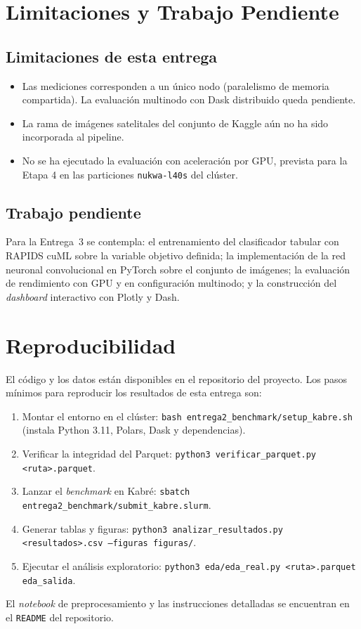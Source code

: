 \documentclass[conference]{IEEEtran}
\begin{document}
\section{Limitaciones y Trabajo Pendiente}

\subsection{Limitaciones de esta entrega}
\begin{itemize}
\item Las mediciones corresponden a un único nodo (paralelismo de memoria compartida). La evaluación multinodo con Dask distribuido queda pendiente.
\item La rama de imágenes satelitales del conjunto de Kaggle aún no ha sido incorporada al pipeline.
\item No se ha ejecutado la evaluación con aceleración por GPU, prevista para la Etapa 4 en las particiones \texttt{nukwa-l40s} del clúster.
\end{itemize}

\subsection{Trabajo pendiente}
Para la Entrega~3 se contempla: el entrenamiento del clasificador tabular con RAPIDS cuML sobre la variable objetivo definida; la implementación de la red neuronal convolucional en PyTorch sobre el conjunto de imágenes; la evaluación de rendimiento con GPU y en configuración multinodo; y la construcción del \textit{dashboard} interactivo con Plotly y Dash.

\section{Reproducibilidad}
El código y los datos están disponibles en el repositorio del proyecto. Los pasos mínimos para reproducir los resultados de esta entrega son:
\begin{enumerate}
\item Montar el entorno en el clúster: \texttt{bash entrega2\_benchmark/setup\_kabre.sh} (instala Python 3.11, Polars, Dask y dependencias).
\item Verificar la integridad del Parquet: \texttt{python3 verificar\_parquet.py <ruta>.parquet}.
\item Lanzar el \textit{benchmark} en Kabré: \texttt{sbatch entrega2\_benchmark/submit\_kabre.slurm}.
\item Generar tablas y figuras: \texttt{python3 analizar\_resultados.py <resultados>.csv --figuras figuras/}.
\item Ejecutar el análisis exploratorio: \texttt{python3 eda/eda\_real.py <ruta>.parquet eda\_salida}.
\end{enumerate}
El \textit{notebook} de preprocesamiento y las instrucciones detalladas se encuentran en el \texttt{README} del repositorio.
\end{document}
